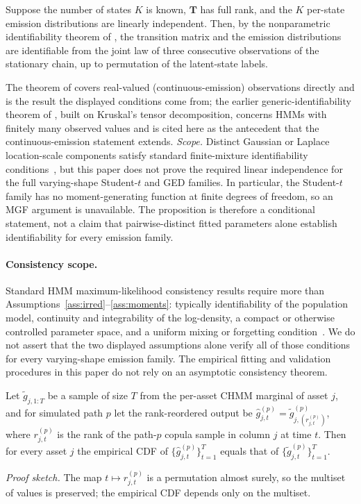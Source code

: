 \begin{proposition}
Suppose the number of states $K$ is known, $\mathbf T$ has full rank, and the $K$ per-state emission distributions are linearly independent. Then, by the nonparametric identifiability theorem of \citet{gassiat2016inference}, the transition matrix and the emission distributions are identifiable from the joint law of three consecutive observations of the stationary chain, up to permutation of the latent-state labels.
\end{proposition}
\noindent The theorem of \citet{gassiat2016inference} covers real-valued (continuous-emission) observations directly and is the result the displayed conditions come from; the earlier generic-identifiability theorem of \citet{allman2009identifiability}, built on Kruskal's tensor decomposition, concerns HMMs with finitely many observed values and is cited here as the antecedent that the continuous-emission statement extends.
\noindent\emph{Scope.} Distinct Gaussian or Laplace location-scale components satisfy standard finite-mixture identifiability conditions~\cite{yakowitzspragins1968}, but this paper does not prove the required linear independence for the full varying-shape Student-$t$ and GED families. In particular, the Student-$t$ family has no moment-generating function at finite degrees of freedom, so an MGF argument is unavailable. The proposition is therefore a conditional statement, not a claim that pairwise-distinct fitted parameters alone establish identifiability for every emission family.

\paragraph{Consistency scope.}
Standard HMM maximum-likelihood consistency results require more than Assumptions~\ref{ass:irred}--\ref{ass:moments}: typically identifiability of the population model, continuity and integrability of the log-density, a compact or otherwise controlled parameter space, and a uniform mixing or forgetting condition~\cite{bickel1998asymptotic,doucmoulinesryden2004}. We do not assert that the two displayed assumptions alone verify all of those conditions for every varying-shape emission family. The empirical fitting and validation procedures in this paper do not rely on an asymptotic consistency theorem.

\begin{proposition}
\label{prop:rank_marginals}
Let $\tilde g_{j, 1:T}$ be a sample of size $T$ from the per-asset CHMM marginal of asset $j$, and for simulated path $p$ let the rank-reordered output be $\hat g_{j,t}^{(p)} = \tilde g_{j, (r_{j,t}^{(p)})}^{(p)}$, where $r_{j,t}^{(p)}$ is the rank of the path-$p$ copula sample in column $j$ at time $t$. Then for every asset $j$ the empirical CDF of $\{\hat g_{j,t}^{(p)}\}_{t=1}^T$ equals that of $\{\tilde g_{j,t}^{(p)}\}_{t=1}^T$.
\end{proposition}
\noindent\emph{Proof sketch.} The map $t \mapsto r_{j,t}^{(p)}$ is a permutation almost surely, so the multiset of values is preserved; the empirical CDF depends only on the multiset.

